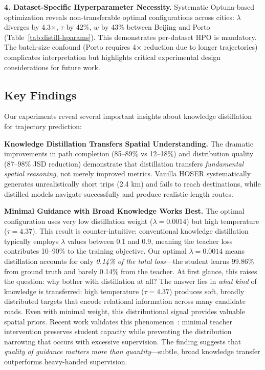 \textbf{4. Dataset-Specific Hyperparameter Necessity.} Systematic Optuna-based optimization reveals non-transferable optimal configurations across cities: $\lambda$ diverges by 4.3$\times$, $\tau$ by 42\%, $w$ by 43\% between Beijing and Porto (Table~\ref{tab:distill-hparams}). This demonstrates per-dataset HPO is mandatory. The batch-size confound (Porto requires 4$\times$ reduction due to longer trajectories) complicates interpretation but highlights critical experimental design considerations for future work.

\subsection{Key Findings}
\label{sec:conclusion-findings}

Our experiments reveal several important insights about knowledge distillation for trajectory prediction:

\textbf{Knowledge Distillation Transfers Spatial Understanding.} The dramatic improvements in path completion (85--89\% vs 12--18\%) and distribution quality (87--98\% JSD reduction) demonstrate that distillation transfers \emph{fundamental spatial reasoning}, not merely improved metrics. Vanilla HOSER systematically generates unrealistically short trips (2.4 km) and fails to reach destinations, while distilled models navigate successfully and produce realistic-length routes.

\textbf{Minimal Guidance with Broad Knowledge Works Best.} The optimal configuration uses very low distillation weight ($\lambda = 0.0014$) but high temperature ($\tau = 4.37$). This result is counter-intuitive: conventional knowledge distillation typically employs $\lambda$ values between 0.1 and 0.9, meaning the teacher loss contributes 10--90\% to the training objective. Our optimal $\lambda = 0.0014$ means distillation accounts for only \emph{0.14\% of the total loss}—the student learns 99.86\% from ground truth and barely 0.14\% from the teacher. At first glance, this raises the question: why bother with distillation at all? The answer lies in \emph{what kind} of knowledge is transferred: high temperature ($\tau = 4.37$) produces soft, broadly distributed targets that encode relational information across many candidate roads. Even with minimal weight, this distributional signal provides valuable spatial priors. Recent work validates this phenomenon~\cite{pengAdaSwitchAdaptiveSwitching2025,singhORPODistillMixedPolicyPreference2025}: minimal teacher intervention preserves student capacity while preventing the distribution narrowing that occurs with excessive supervision. The finding suggests that \emph{quality of guidance matters more than quantity}—subtle, broad knowledge transfer outperforms heavy-handed supervision.

